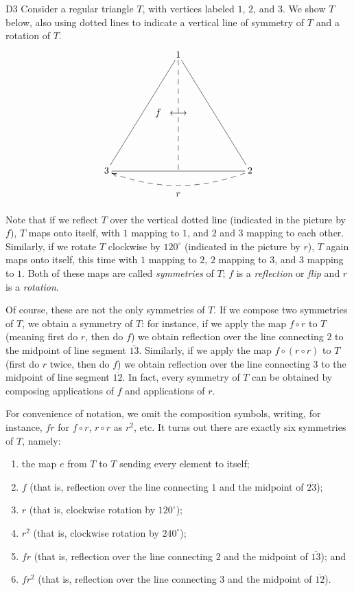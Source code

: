 \begin{example}{D3} Consider a regular triangle $T$, with vertices labeled $1$, $2$, and $3$.  We show $T$ below, also using dotted lines to indicate a vertical line of symmetry of $T$ and a rotation of $T$.
$$\xymatrix @R=1.732cm   @C=2cm {&1\ar@{-}[ldd]\ar@{-}[rdd]\ar@{--}[dd]_{\begin{array}{cc}f& \end{array}}\\ &\longleftrightarrow &
\\ 3\ar@{-}[rr]&&2\ar@{-->}@/^{15pt}/[ll]^{\begin{array}{ccc}&r& \end{array}}}$$


Note that if we reflect $T$ over the vertical dotted line (indicated in the picture by $f$), $T$ maps onto itself, with $1$ mapping to $1$, and $2$ and $3$ mapping to each other. Similarly, if we rotate $T$ clockwise by $120^{\circ}$ (indicated in the picture by $r$), $T$ again maps onto itself, this time with $1$ mapping to $2$, $2$ mapping to $3$, and $3$ mapping to $1$.  Both of these maps are called \textit{symmetries} of $T$; $f$ is a {\it reflection} or {\it flip} and $r$ is a {\it rotation}.

Of course, these are not the only symmetries of $T$. If we compose
two symmetries of $T$, we obtain a symmetry of $T$: for instance, if
we apply the map $f\circ r$ to $T$ (meaning first do $r$, then do
$f$) we obtain reflection over the line connecting $2$ to the
midpoint of line segment $\overline{13}$.  Similarly, if we apply
the map $f\circ (r\circ r)$ to $T$ (first do $r$ twice, then do $f$)
we obtain reflection over the line connecting $3$ to the midpoint of
line segment $\overline{12}$.  In fact, every symmetry of $T$ can be
obtained by composing applications of $f$ and applications of $r$.

For convenience of notation, we omit the composition symbols, writing, for instance, $fr$ for $f\circ r$, $r\circ r$ as $r^2$, etc. It turns out there are exactly six  symmetries of $T$, namely:
\begin{enumerate}
\item the map $e$ from $T$ to $T$ sending every element to itself;
\item $f$ (that is, reflection over the line connecting $1$ and the midpoint of $\overline{23}$);
\item $r$ (that is, clockwise rotation by $120^{\circ}$);
\item $r^2$ (that is, clockwise rotation by $240^{\circ}$);
\item $fr$ (that is, reflection over the line connecting $2$ and the midpoint of $\overline{13}$); and
\item $fr^2$ (that is, reflection over the line connecting $3$ and the midpoint of $\overline{12}$).
\end{enumerate}


\end{example}
